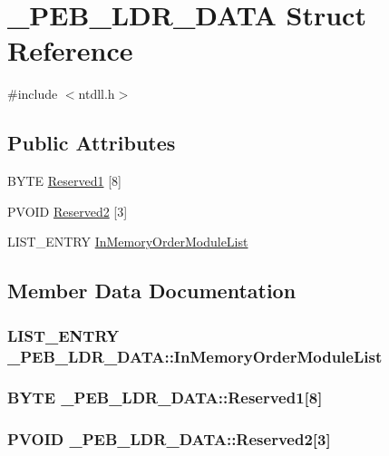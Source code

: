 \section{\-\_\-\-P\-E\-B\-\_\-\-L\-D\-R\-\_\-\-D\-A\-T\-A Struct Reference}
\label{struct___p_e_b___l_d_r___d_a_t_a}


{\ttfamily \#include $<$ntdll.\-h$>$}

\subsection*{Public Attributes}
\begin{DoxyCompactItemize}
\item 
B\-Y\-T\-E \hyperlink{struct___p_e_b___l_d_r___d_a_t_a_a3a59722c5b526cd5958e7d8ba4273b48}{Reserved1} \mbox{[}8\mbox{]}
\item 
P\-V\-O\-I\-D \hyperlink{struct___p_e_b___l_d_r___d_a_t_a_ae03dc4a02889a4a4f6a35bfe261892f9}{Reserved2} \mbox{[}3\mbox{]}
\item 
L\-I\-S\-T\-\_\-\-E\-N\-T\-R\-Y \hyperlink{struct___p_e_b___l_d_r___d_a_t_a_a84cc2fa96f7fe4038637cfe104f9e567}{In\-Memory\-Order\-Module\-List}
\end{DoxyCompactItemize}


\subsection{Member Data Documentation}
\subsubsection[{In\-Memory\-Order\-Module\-List}]{\setlength{\rightskip}{0pt plus 5cm}L\-I\-S\-T\-\_\-\-E\-N\-T\-R\-Y \-\_\-\-P\-E\-B\-\_\-\-L\-D\-R\-\_\-\-D\-A\-T\-A\-::\-In\-Memory\-Order\-Module\-List}\label{struct___p_e_b___l_d_r___d_a_t_a_a84cc2fa96f7fe4038637cfe104f9e567}
\subsubsection[{Reserved1}]{\setlength{\rightskip}{0pt plus 5cm}B\-Y\-T\-E \-\_\-\-P\-E\-B\-\_\-\-L\-D\-R\-\_\-\-D\-A\-T\-A\-::\-Reserved1\mbox{[}8\mbox{]}}\label{struct___p_e_b___l_d_r___d_a_t_a_a3a59722c5b526cd5958e7d8ba4273b48}
\subsubsection[{Reserved2}]{\setlength{\rightskip}{0pt plus 5cm}P\-V\-O\-I\-D \-\_\-\-P\-E\-B\-\_\-\-L\-D\-R\-\_\-\-D\-A\-T\-A\-::\-Reserved2\mbox{[}3\mbox{]}}\label{struct___p_e_b___l_d_r___d_a_t_a_ae03dc4a02889a4a4f6a35bfe261892f9}
